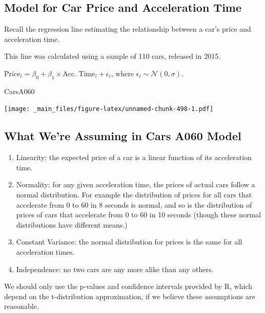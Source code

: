 \documentclass[]{book}
\newenvironment{Shaded}{\begin{snugshade}}{\end{snugshade}}
\newcommand{\NormalTok}[1]{#1}
\begin{document}
\subsection{Model for Car Price and Acceleration
Time}\label{model-for-car-price-and-acceleration-time-1}

Recall the regression line estimating the relationship between a car's
price and acceleration time.

This line was calculated using a sample of 110 cars, released in 2015.

\(\text{Price}_i = \beta_0 + \beta_1\times\text{Acc. Time}_i + \epsilon_i\),
where \(\epsilon_i\sim\mathcal{N}(0, \sigma)\).

\begin{Shaded}
\begin{Highlighting}[]
\NormalTok{CarsA060}
\end{Highlighting}
\end{Shaded}

\texttt{[image: \_main\_files/figure-latex/unnamed-chunk-498-1.pdf]}

\subsection{What We're Assuming in Cars A060
Model}\label{what-were-assuming-in-cars-a060-model}

\begin{enumerate}
\def\labelenumi{\arabic{enumi}.}
\item
  Linearity: the expected price of a car is a linear function of its
  acceleration time.
\item
  Normality: for any given acceleration time, the prices of actual cars
  follow a normal distribution. For example the distribution of prices
  for all cars that accelerate from 0 to 60 in 8 seconds is normal, and
  so is the distribution of prices of cars that accelerate from 0 to 60
  in 10 seconds (though these normal distributions have different
  means.)
\item
  Constant Variance: the normal distribution for prices is the same for
  all acceleration times.
\item
  Independence: no two cars are any more alike than any others.
\end{enumerate}

We should only use the p-values and confidence intervals provided by R,
which depend on the t-distribution approximation, if we believe these
assumptions are reasonable.
\end{document}
